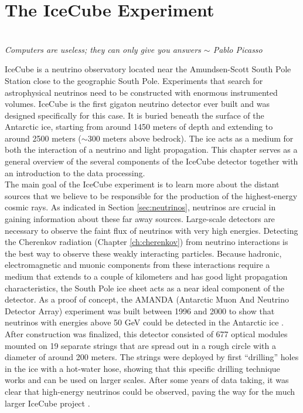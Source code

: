 \chapter{The IceCube Experiment}
\label{ch:icecube}
\begin{flushright}
\textit{\\Computers are useless; they can only give you answers $\sim$ Pablo Picasso\\}
\end{flushright}
IceCube is a neutrino observatory located near the Amundsen-Scott South Pole Station close to the geographic South Pole. Experiments that search for astrophysical neutrinos need to be constructed with enormous instrumented volumes. IceCube is the first gigaton neutrino detector ever built and was designed specifically for this case. It is buried beneath the surface of the Antarctic ice, starting from around 1450 meters of depth and extending to around 2500 meters ($\sim$300 meters above bedrock). The ice acts as a medium for both the interaction of a neutrino and light propagation. This chapter serves as a general overview of the several components of the IceCube detector together with an introduction to the data processing.\\
\newline
\noindent The main goal of the IceCube experiment is to learn more about the distant sources that we believe to be responsible for the production of the highest-energy cosmic rays. As indicated in Section \ref{sec:neutrinos}, neutrinos are crucial in gaining information about these far away sources. Large-scale detectors are necessary to observe the faint flux of neutrinos with very high energies. Detecting the Cherenkov radiation (Chapter \ref{ch:cherenkov}) from neutrino interactions is the best way to observe these weakly interacting particles. Because hadronic, electromagnetic and muonic components from these interactions require a medium that extends to a couple of kilometers and has good light propagation characteristics, the South Pole ice sheet acts as a near ideal component of the detector. As a proof of concept, the AMANDA (Antarctic Muon And Neutrino Detector Array) experiment was built between 1996 and 2000 to show that neutrinos with energies above 50 GeV could be detected in the Antarctic ice \cite{amandaurl,Andres:1999hm}. After construction was finalized, this detector consisted of 677 optical modules mounted on 19 separate strings that are spread out in a rough circle with a diameter of around 200 meters. The strings were deployed by first ``drilling'' holes in the ice with a hot-water hose, showing that this specific drilling technique works and can be used on larger scales. After some years of data taking, it was clear that high-energy neutrinos could be observed, paving the way for the much larger IceCube project \cite{Ahrens:2002gq}.


